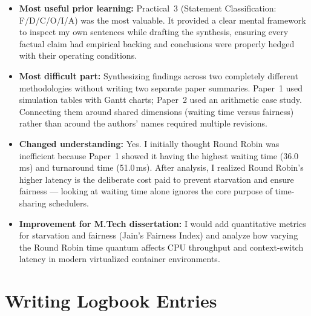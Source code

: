 \documentclass[11pt, a4paper]{article}
\begin{document}
\begin{itemize}[nosep]
    \item \textbf{Most useful prior learning:} Practical~3 (Statement Classification: F/D/C/O/I/A) was the most valuable. It provided a clear mental framework to inspect my own sentences while drafting the synthesis, ensuring every factual claim had empirical backing and conclusions were properly hedged with their operating conditions.

    \item \textbf{Most difficult part:} Synthesizing findings across two completely different methodologies without writing two separate paper summaries. Paper~1 used simulation tables with Gantt charts; Paper~2 used an arithmetic case study. Connecting them around shared dimensions (waiting time versus fairness) rather than around the authors' names required multiple revisions.

    \item \textbf{Changed understanding:} Yes. I initially thought Round Robin was inefficient because Paper~1 showed it having the highest waiting time (36.0\,ms) and turnaround time (51.0\,ms). After analysis, I realized Round Robin's higher latency is the deliberate cost paid to prevent starvation and ensure fairness --- looking at waiting time alone ignores the core purpose of time-sharing schedulers.

    \item \textbf{Improvement for M.Tech dissertation:} I would add quantitative metrics for starvation and fairness (Jain's Fairness Index) and analyze how varying the Round Robin time quantum affects CPU throughput and context-switch latency in modern virtualized container environments.
\end{itemize}

\section{Writing Logbook Entries}
\end{document}
